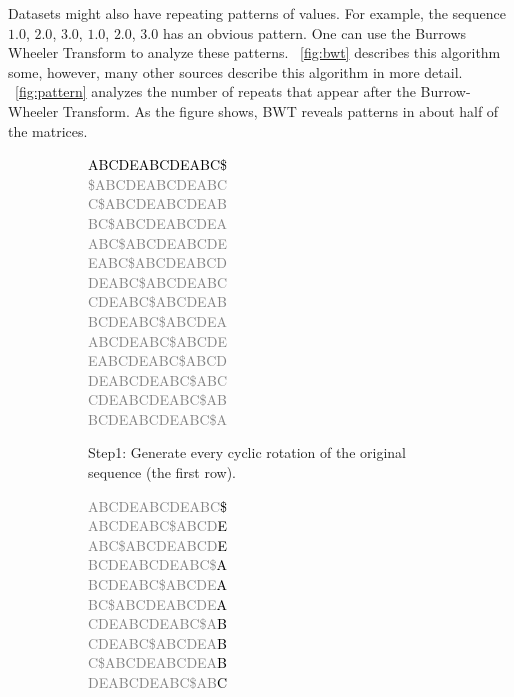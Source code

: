 Datasets might also have repeating patterns of values. For example, the sequence $1.0$, $2.0$, $3.0$, $1.0$, $2.0$, $3.0$ has an obvious pattern. One can use the Burrows Wheeler Transform\cite{prelim:burrows} to analyze these patterns. \figurename~\ref{fig:bwt} describes this algorithm some, however, many other sources describe this algorithm in more detail\cite{prelim:burrows,prelim:salomon}. \figurename~\ref{fig:pattern} analyzes the number of repeats that appear after the Burrow-Wheeler Transform. As the figure shows, BWT reveals patterns in about half of the matrices.
\begin{figure}
\center
\begin{subfigure}{.3\linewidth}
\footnotesize
\textcolor{gray}{
\textcolor{black}{ABCDEABCDEABC\$}\\
\$ABCDEABCDEABC\\
C\$ABCDEABCDEAB\\
BC\$ABCDEABCDEA\\
ABC\$ABCDEABCDE\\
EABC\$ABCDEABCD\\
DEABC\$ABCDEABC\\
CDEABC\$ABCDEAB\\
BCDEABC\$ABCDEA\\
ABCDEABC\$ABCDE\\
EABCDEABC\$ABCD\\
DEABCDEABC\$ABC\\
CDEABCDEABC\$AB\\
BCDEABCDEABC\$A\\
}
\caption{Step1: Generate every cyclic rotation of the original sequence (the first row).}
\label{fig:bwtStep1}
\end{subfigure}
\begin{subfigure}{.3\linewidth}
\footnotesize
\textcolor{gray}{
ABCDEABCDEABC\textcolor{black}{\$}\\
ABCDEABC\$ABCD\textcolor{black}{E}\\
ABC\$ABCDEABCD\textcolor{black}{E}\\
BCDEABCDEABC\$\textcolor{black}{A}\\
BCDEABC\$ABCDE\textcolor{black}{A}\\
BC\$ABCDEABCDE\textcolor{black}{A}\\
CDEABCDEABC\$A\textcolor{black}{B}\\
CDEABC\$ABCDEA\textcolor{black}{B}\\
C\$ABCDEABCDEA\textcolor{black}{B}\\
DEABCDEABC\$AB\textcolor{black}{C}\\
}
\end{subfigure}
\end{figure}
